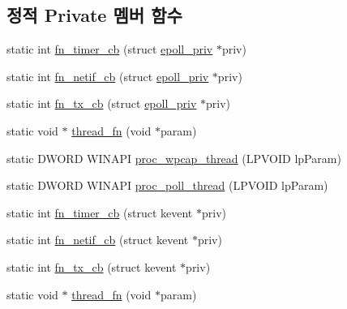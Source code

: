 \subsection*{정적 Private 멤버 함수}
\begin{DoxyCompactItemize}
\item 
static int \hyperlink{classavdecc__lib_1_1system__layer2__multithreaded__callback_ab09283b3cef1ee9a8c8664181b87f677}{fn\+\_\+timer\+\_\+cb} (struct \hyperlink{structavdecc__lib_1_1system__layer2__multithreaded__callback_1_1epoll__priv}{epoll\+\_\+priv} $\ast$priv)
\item 
static int \hyperlink{classavdecc__lib_1_1system__layer2__multithreaded__callback_a63fb99460e4c14516895f7143b1d54ff}{fn\+\_\+netif\+\_\+cb} (struct \hyperlink{structavdecc__lib_1_1system__layer2__multithreaded__callback_1_1epoll__priv}{epoll\+\_\+priv} $\ast$priv)
\item 
static int \hyperlink{classavdecc__lib_1_1system__layer2__multithreaded__callback_a4a9be0424c86a39d845718179eccbc18}{fn\+\_\+tx\+\_\+cb} (struct \hyperlink{structavdecc__lib_1_1system__layer2__multithreaded__callback_1_1epoll__priv}{epoll\+\_\+priv} $\ast$priv)
\item 
static void $\ast$ \hyperlink{classavdecc__lib_1_1system__layer2__multithreaded__callback_a85f7af05b7e90c9263ed417fad338e9c}{thread\+\_\+fn} (void $\ast$param)
\item 
static D\+W\+O\+RD W\+I\+N\+A\+PI \hyperlink{classavdecc__lib_1_1system__layer2__multithreaded__callback_ad7bae9029cfd94ddfc1a8587983284d8}{proc\+\_\+wpcap\+\_\+thread} (L\+P\+V\+O\+ID lp\+Param)
\item 
static D\+W\+O\+RD W\+I\+N\+A\+PI \hyperlink{classavdecc__lib_1_1system__layer2__multithreaded__callback_aa8dd34a38f4c790224371eb87546adcf}{proc\+\_\+poll\+\_\+thread} (L\+P\+V\+O\+ID lp\+Param)
\item 
static int \hyperlink{classavdecc__lib_1_1system__layer2__multithreaded__callback_a13dcf5777c2cace90a6000aa37dbf088}{fn\+\_\+timer\+\_\+cb} (struct kevent $\ast$priv)
\item 
static int \hyperlink{classavdecc__lib_1_1system__layer2__multithreaded__callback_a2998c482da8a84bcfceb31bbfa110cfe}{fn\+\_\+netif\+\_\+cb} (struct kevent $\ast$priv)
\item 
static int \hyperlink{classavdecc__lib_1_1system__layer2__multithreaded__callback_ac5655b674c574257bd228419ecfa5d74}{fn\+\_\+tx\+\_\+cb} (struct kevent $\ast$priv)
\item 
static void $\ast$ \hyperlink{classavdecc__lib_1_1system__layer2__multithreaded__callback_a014180a70dcf92f5b411a3f813f1af6c}{thread\+\_\+fn} (void $\ast$param)
\end{DoxyCompactItemize}
